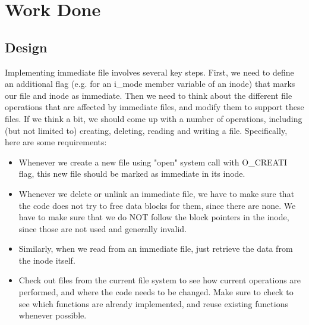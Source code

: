 \chapter{Work Done}

\section{Design}

Implementing immediate file involves several key steps. First, we need to define an additional flag (e.g. for an i\_mode member variable of an inode) that marks our file and inode as immediate. Then we need to think about the different file operations that are affected by immediate files, and modify them to support these files. If we think a bit, we should come up with a number of operations, including (but not limited to) creating, deleting, reading and writing a file. Specifically, here are some requirements:

\begin{itemize}

\item Whenever we create a new file using "open" system call with O\_CREATI flag, this new file should be marked as immediate in its inode.

\item Whenever we delete or unlink an immediate file, we have to make sure that the code does not try to free data blocks for them, since there are none. We have to make sure that we do NOT follow the block pointers in the inode, since those are not used and generally invalid.

\item Similarly, when we read from an immediate file, just retrieve the data from the inode itself.

\item Check out files from the current file system to see how current operations are performed, and where the code needs to be changed. Make sure to check to see which functions are already implemented, and reuse existing functions whenever possible.
\end{itemize}
   





